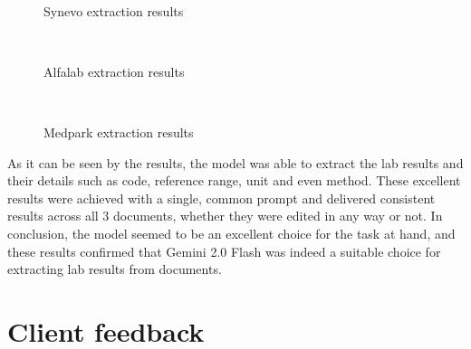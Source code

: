\begin{figure}[ht]
    \centering
    \\[\baselineskip]
    \caption{Synevo extraction results}\label{fig:synevo}
\end{figure}

\begin{figure}[ht]
    \centering
    \\[\baselineskip]
    \caption{Alfalab extraction results}\label{fig:alfalab}
\end{figure}

\begin{figure}[ht]
    \centering
    \\[\baselineskip]
    \caption{Medpark extraction results}\label{fig:medpark}
\end{figure}

\FloatBarrier{}

As it can be seen by the results, the model was able to extract the lab results and their details such as code, reference range, unit and even method. These excellent results were achieved with a single, common prompt and delivered consistent results across all 3 documents, whether they were edited in any way or not. In conclusion, the model seemed to be an excellent choice for the task at hand, and these results confirmed that Gemini 2.0 Flash was indeed a suitable choice for extracting lab results from documents.

\section{Client feedback}